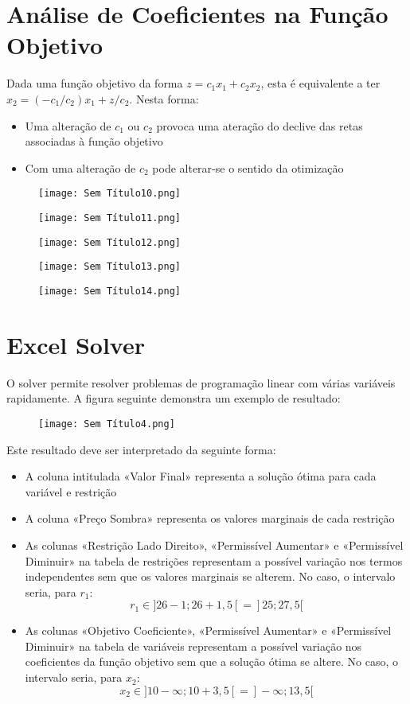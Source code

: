 \documentclass[10pt,a4paper]{report}
\begin{document}
\section{Análise de Coeficientes na Função Objetivo}%
Dada uma função objetivo da forma $z = c_1x_1 + c_2x_2$, esta é equivalente a ter $x_2 = (-c_1/c_2)x_1 + z/c_2$. Nesta forma:
\begin{itemize}
\item Uma alteração de $c_1$ ou $c_2$ provoca uma ateração do declive das retas associadas à função objetivo
\item Com uma alteração de $c_2$ pode alterar-se o sentido da otimização
\end{itemize}
\begin{figure}[H]
\centering
\texttt{[image: Sem Título10.png]}
\end{figure}
\begin{figure}[H]
\centering
\texttt{[image: Sem Título11.png]}
\end{figure}
\begin{figure}[H]
\centering
\texttt{[image: Sem Título12.png]}
\end{figure}
\begin{figure}[H]
\centering
\texttt{[image: Sem Título13.png]}
\end{figure}
\begin{figure}[H]
\centering
\texttt{[image: Sem Título14.png]}
\end{figure}
\section{Excel Solver}
O solver permite resolver problemas de programação linear com várias variáveis rapidamente. A figura seguinte demonstra um exemplo de resultado:
\begin{figure}[H]
\centering
\texttt{[image: Sem Título4.png]}
\end{figure}
Este resultado deve ser interpretado da seguinte forma:
\begin{itemize}
\item A coluna intitulada «Valor Final» representa a solução ótima para cada variável e restrição 
\item A coluna «Preço Sombra» representa os valores marginais de cada restrição
\item As colunas «Restrição Lado Direito», «Permissível Aumentar» e «Permissível Diminuir» na tabela de restrições representam a possível variação nos termos independentes sem que os valores marginais se alterem. No caso, o intervalo seria, para $r_1$:
$$
r_1 \in ]26-1; 26+1,5[ = ]25; 27,5[
$$
\item As colunas «Objetivo Coeficiente», «Permissível Aumentar» e «Permissível Diminuir» na tabela de variáveis representam a possível variação nos coeficientes da função objetivo sem que a solução ótima se altere. No caso, o intervalo seria, para $x_2$:
$$
x_2 \in ]10-\infty; 10+3,5[ = ]-\infty; 13,5[
$$
\end{itemize}
\end{document}
